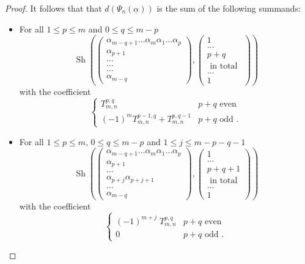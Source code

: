 \documentclass[12pt,a4paper,reqno]{amsart}
\DeclareMathOperator{\shfl}{{\mathrm{Sh}}}
\begin{document}
\begin{proof}
It follows that that $d(\Psi_n(\underline{\alpha}))$ is the sum of
the following summands:
\begin{itemize}
\item For all $1 \leq p \leq m$ and $0 \leq q \leq m-p$ 
$$ \shfl\left(
\left(
\begin{matrix}
\alpha_{m-q+1} \dots \alpha_m \alpha_1 \dots \alpha_p \\
\alpha_{p+1} \\
\dots \\
\dots \\
\dots \\
\alpha_{m-q} 
\end{matrix}
\right), 
\left(
\begin{matrix}
1 \\
\dots \\
p+q \\
\text{ in total } \\
\dots \\
1
\end{matrix}
\right)
\right) $$
with the coefficient
$$
\begin{cases}
T^{p,q}_{m,n} & p + q \text{ even } \\
(-1)^m T^{p-1,q}_{m,n} + T^{p,q-1}_{m,n} & p + q \text{ odd }. 
\end{cases}
$$
\item For all $1 \leq p \leq m$, $0 \leq q \leq m-p$ and $1 \leq j
\leq m-p-q-1$
$$ \shfl\left(
\left(
\begin{matrix}
\alpha_{m-q+1} \dots \alpha_m \alpha_1 \dots \alpha_p \\
\alpha_{p+1} \\
\dots \\
\alpha_{p+j}\alpha_{p+j+1} \\
\dots \\
\alpha_{m-q} 
\end{matrix}
\right), 
\left(
\begin{matrix}
1 \\
\dots \\
p+q+1 \\
\text{ in total } \\
\dots \\
1
\end{matrix}
\right)
\right) $$
with the coefficient
$$
\begin{cases}
(-1)^{m+j}\; T^{p,q}_{m,n}  & p + q \text{ even } \\
0             & p + q \text{ odd }. 
\end{cases}
$$
\end{itemize}
\end{proof}
\end{document}
